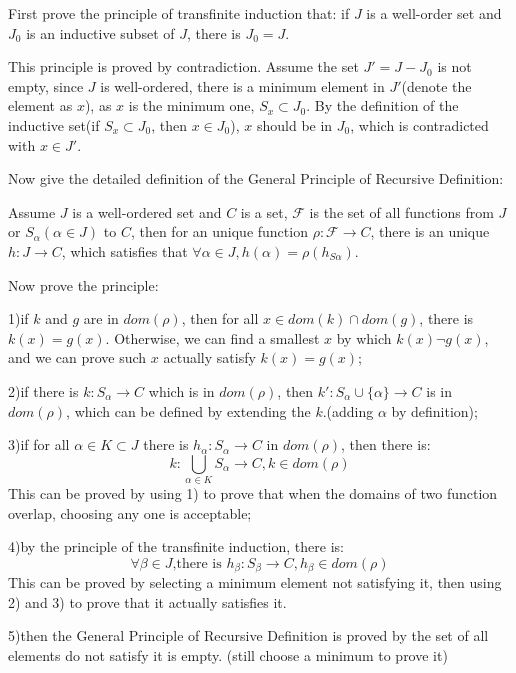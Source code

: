 \documentclass{article}
\begin{document}
    First prove the principle of transfinite induction that: if $J$ is a well-order set and $J_0$ is an inductive subset of $J$, there is $J_0=J$.

    This principle is proved by contradiction. Assume the set $J'=J-J_0$ is not empty, since $J$ is well-ordered, 
    there is a minimum element in $J'$(denote the element as $x$), as $x$ is the minimum one, $S_x\subset J_0$. 
    By the definition of the inductive set(if $S_x\subset J_0$, then $x\in J_0$), $x$ should be in $J_0$, 
    which is contradicted with $x\in J'$.

    Now give the detailed definition of the General Principle of Recursive Definition:

    Assume $J$ is a well-ordered set and $C$ is a set, 
    $\mathscr F$ is the set of all functions from $J$ or $S_\alpha(\alpha\in J)$ to $C$, 
    then for an unique function $\rho:\mathscr F\rightarrow C$, there is an unique $h:J\rightarrow C$, 
    which satisfies that $\forall \alpha\in J, h(\alpha)=\rho(h_{S\alpha})$. 

    Now prove the principle:

    1)if $k$ and $g$ are in $dom(\rho)$, then for all $x\in dom(k)\cap dom(g)$, there is $k(x)=g(x)$. 
    Otherwise, we can find a smallest $x$ by which $k(x)\neg g(x)$, and we can prove such $x$ actually satisfy $k(x)=g(x)$;

    2)if there is $k:S_\alpha\rightarrow C$ which is in $dom(\rho)$, then $k':S_\alpha\cup\{\alpha\}\rightarrow C$ is in $dom(\rho)$, 
    which can be defined by extending the $k$.(adding $\alpha$ by definition);

    3)if for all $\alpha\in K\subset J$ there is $h_\alpha:S_\alpha\rightarrow C$ in $dom(\rho)$, then there is: 
    $$k:\bigcup_{\alpha\in K}S_\alpha\rightarrow C, k\in dom(\rho)$$
    This can be proved by using 1) to prove that when the domains of two function overlap, choosing any one is acceptable; 

    4)by the principle of the transfinite induction, there is:
    $$\forall\beta\in J\text{,there is }h_\beta:S_\beta\rightarrow C, h_\beta\in dom(\rho)$$
    This can be proved by selecting a minimum element not satisfying it, then using 2) and 3) to prove that it actually satisfies it. 

    5)then the General Principle of Recursive Definition is proved by the set of all elements do not satisfy it is empty. (still choose a minimum to prove it)
\end{document}
